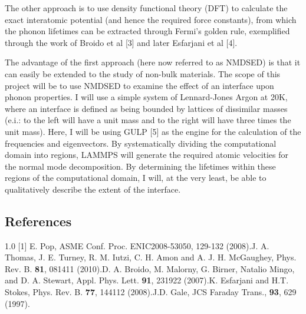 \documentclass{article}
\begin{document}
The other approach is to use density functional theory (DFT) to calculate the exact interatomic potential (and hence the required force constants), from which the phonon lifetimes can be extracted through Fermi’s golden rule, exemplified through the work of Broido et al [3] and later Esfarjani et al [4]. 

The advantage of the first approach (here now referred to as NMDSED) is that it can easily be extended to the study of non-bulk materials. The scope of this project will be to use NMDSED to examine the effect of an interface upon phonon properties. I will use a simple system of Lennard-Jones Argon at 20K, where an interface is defined as being bounded by lattices of dissimilar masses (e.i.: to the left will have a unit mass and to the right will have three times the unit mass). Here, I will be using GULP [5] as the engine for the calculation of the frequencies and eigenvectors. By systematically dividing the computational domain into regions, LAMMPS will generate the required atomic velocities for the normal mode decomposition. By determining the lifetimes within these regions of the computational domain, I will, at the very least, be able to qualitatively describe the extent of the interface.

\subsection*{References}
\begin{spacing}{1.0}
[1] E. Pop, ASME Conf. Proc. ENIC2008-53050, 129-132 (2008).\newline
[2] J. A. Thomas, J. E. Turney, R. M. Iutzi, C. H. Amon and A. J. H. McGaughey, Phys. Rev. B. \textbf{81}, 081411 (2010).\newline
[3] D. A. Broido, M. Malorny, G. Birner, Natalio Mingo, and D. A. Stewart, Appl. Phys. Lett. \textbf{91}, 231922 (2007).\newline
[4] K. Esfarjani and H.T. Stokes, Phys. Rev. B. \textbf{77}, 144112 (2008).\newline
[5] J.D. Gale, JCS Faraday Trans., \textbf{93}, 629 (1997).\newline
\end{spacing}
\end{document}
